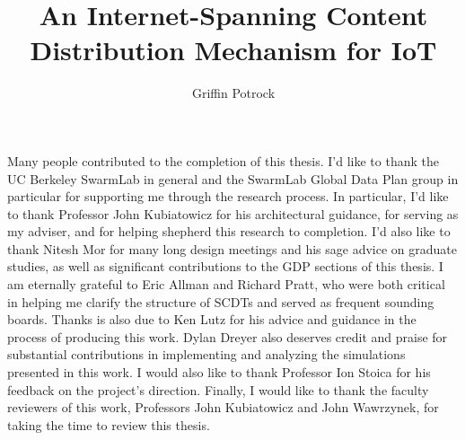\documentclass[masters]{ucbthesis}
\begin{document}

\title{An Internet-Spanning Content Distribution Mechanism for IoT}
\author{Griffin Potrock}




\maketitle
\approvalpage
\copyrightpage



\begin{frontmatter}


\tableofcontents
\clearpage
\listoffigures
\clearpage
\listoftables

\begin{acknowledgements}
Many people contributed to the completion of this thesis. I'd like to thank the UC Berkeley SwarmLab in general and the SwarmLab Global Data Plan group in particular for supporting me through the research process. In particular, I'd like to thank Professor John Kubiatowicz for his architectural guidance, for serving as my adviser, and for helping shepherd this research to completion. I'd also like to thank Nitesh Mor for many long design meetings and his sage advice on graduate studies, as well as significant contributions to the GDP sections of this thesis. I am eternally grateful to Eric Allman and Richard Pratt, who were both critical in helping me clarify the structure of SCDTs and served as frequent sounding boards. Thanks is also due to Ken Lutz for his advice and guidance in the process of producing this work. Dylan Dreyer also deserves credit and praise for substantial contributions in implementing and analyzing the simulations presented in this work.  I would also like to thank Professor Ion Stoica for his feedback on the project's direction.  Finally, I would like to thank the faculty reviewers of this work, Professors John Kubiatowicz and John Wawrzynek, for taking the time to review this thesis.
\end{acknowledgements}

\end{frontmatter}

\pagestyle{headings}









\printbibliography
\end{document}
